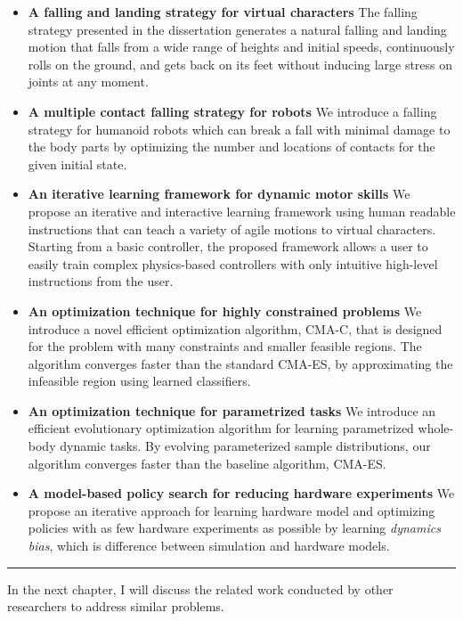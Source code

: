\begin{itemize}
\item \textbf{A falling and landing strategy for virtual characters}
  The falling strategy presented in the dissertation generates a natural falling
  and landing motion that falls from a wide range of heights and initial
  speeds, continuously rolls on the ground, and gets back on its feet without
  inducing large stress on joints at any moment.
\item \textbf{A multiple contact falling strategy for robots}
  We introduce a falling strategy for humanoid robots which can break a
  fall with minimal damage to the body parts by optimizing the number and
  locations of contacts for the given initial state. 
\item \textbf{An iterative learning framework for dynamic motor skills}
  We propose an iterative and interactive learning framework 
  using human readable instructions that can teach a variety of agile motions
  to virtual characters.
  Starting from a basic controller, the proposed framework allows a user 
  to easily train complex physics-based controllers 
  with only intuitive high-level instructions from the user.
\item \textbf{An optimization technique for highly constrained problems}
  We introduce a novel efficient optimization algorithm, CMA-C, that is 
  designed for the problem with many constraints and smaller feasible regions.
  The algorithm converges faster than the standard CMA-ES,
  by approximating the infeasible region using learned classifiers.
\item \textbf{An optimization technique for parametrized tasks}
  We introduce an efficient evolutionary optimization algorithm for learning
  parametrized whole-body dynamic tasks.
  By evolving parameterized sample distributions, our algorithm
  converges faster than the baseline algorithm, CMA-ES.
\item \textbf{A model-based policy search for reducing hardware experiments}
  We propose an iterative approach for learning hardware model and optimizing
  policies with as few hardware experiments as possible by learning
  \emph{dynamics bias}, which is difference between simulation and hardware
  models. 
\end{itemize}

\rule{0.95\textwidth}{1pt}

In the next chapter, I will discuss the related work conducted by other
researchers to address similar problems.

